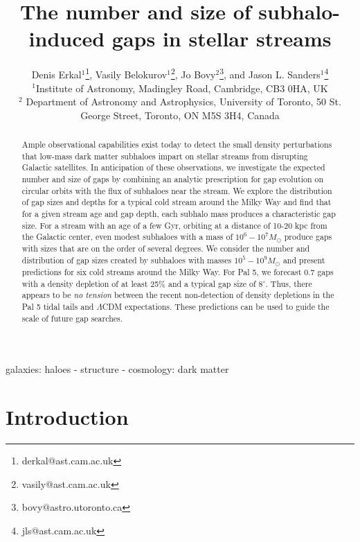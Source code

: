 \documentclass[useAMS,usenatbib]{mn2e}
\title[The number and size of subhalo-induced gaps in stellar
  streams]{The number and size of
  subhalo-induced gaps in stellar streams}
\author[D. Erkal, V. Belokurov, J. Bovy, J. L. Sanders]
  {Denis Erkal$^1$\thanks{derkal@ast.cam.ac.uk}, Vasily Belokurov$^1$\thanks{vasily@ast.cam.ac.uk}, Jo Bovy$^2$\thanks{bovy@astro.utoronto.ca}, and Jason L. Sanders$^1$\thanks{jls@ast.cam.ac.uk} \\
  $^1$Institute of Astronomy, Madingley Road, Cambridge, CB3 0HA, UK \\ $^2$ Department of Astronomy and Astrophysics, University of Toronto, 50 St. George Street, Toronto, ON M5S 3H4, Canada}
\begin{document}
\label{firstpage}

\maketitle

\begin{abstract}
Ample observational capabilities exist today to detect the small
density perturbations that low-mass dark matter subhaloes impart on
stellar streams from disrupting Galactic satellites. In anticipation
of these observations, we investigate the expected number and size of
gaps by combining an analytic prescription for gap evolution on
circular orbits with the flux of subhaloes near the stream. We explore
the distribution of gap sizes and depths for a typical cold stream
around the Milky Way and find that for a given stream age and gap
depth, each subhalo mass produces a characteristic gap size. For a
stream with an age of a few Gyr, orbiting at a distance of 10-20 kpc
from the Galactic center, even modest subhaloes with a mass of
$10^6-10^7 M_\odot$ produce gaps with sizes that are on the order of
several degrees. We consider the number and distribution of gap sizes
created by subhaloes with masses $10^5-10^9 M_\odot$ and present
predictions for six cold streams around the Milky Way. For Pal 5, we
forecast 0.7 gaps with a density depletion of at least 25\% and a
typical gap size of $8^\circ$. Thus, there appears to be {\it no
  tension} between the recent non-detection of density depletions in
the Pal 5 tidal tails and $\Lambda$CDM expectations. These predictions
can be used to guide the scale of future gap searches.
\end{abstract}

\begin{keywords}
 galaxies: haloes - structure - cosmology: dark matter
\end{keywords}

\section{Introduction}
\end{document}
